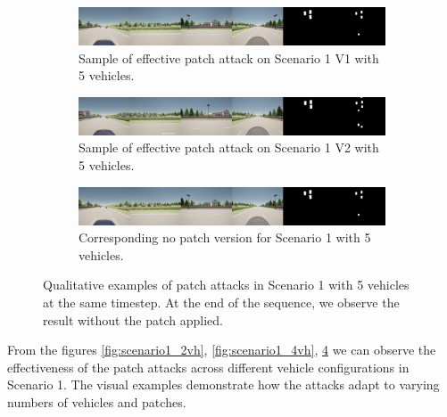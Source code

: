 \begin{figure}[tph]
    \centering
    \begin{subfigure}[b]{1\textwidth}
        \centering
        \includegraphics[width=\textwidth]{figures/results/scenario1v15vh.png}
        \caption{Sample of effective patch attack on Scenario 1 V1 with 5 vehicles.}
        \label{fig:scenario1_5vh_v1}
    \end{subfigure}
    \vspace{0.5cm}
    \begin{subfigure}[b]{1\textwidth}
        \centering
        \includegraphics[width=\textwidth]{figures/results/scenario1v25vh.jpg}
        \caption{Sample of effective patch attack on Scenario 1 V2 with 5 vehicles.}
        \label{fig:scenario1_5vh_v2}
    \end{subfigure}
    \vspace{0.5cm}
    \begin{subfigure}[b]{1\textwidth}
        \centering
        \includegraphics[width=\textwidth]{figures/results/scenario1v15vh_nopatch.png}
        \caption{Corresponding no patch version for Scenario 1 with 5 vehicles.}
        \label{fig:scenario1_5vh_nopatch}
    \end{subfigure}
    \caption{Qualitative examples of patch attacks in Scenario 1 with 5 vehicles at the same timestep.
        At the end of the sequence, we observe the result without the patch applied.}
    \label{fig:scenario1_5vh}
\end{figure}

From the figures \ref{fig:scenario1_2vh}, \ref{fig:scenario1_4vh}, \ref{fig:scenario1_5vh} we can observe the effectiveness of the patch attacks across different vehicle configurations in Scenario 1.
The visual examples demonstrate how the attacks adapt to varying numbers of vehicles and patches.

